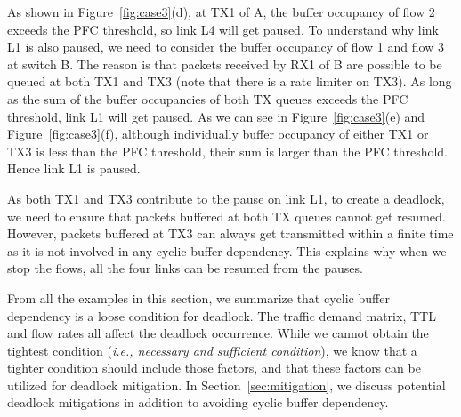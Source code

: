 As shown in Figure~\ref{fig:case3}(d), at TX1 of A, the buffer occupancy of flow 2 exceeds the PFC 
threshold, so link L4 will get paused. To understand why link L1 is also paused, we need to consider 
the buffer occupancy of flow 1 and flow 3 at switch B. The reason is that packets received by RX1 of 
B are possible to be queued at both TX1 and TX3 (note that there is a rate limiter on TX3). As long 
as the sum of the buffer occupancies of both TX queues exceeds the PFC threshold, link L1 will get paused. 
As we can see in Figure~\ref{fig:case3}(e) and Figure~\ref{fig:case3}(f), although individually buffer 
occupancy of either TX1 or TX3 is less than the PFC threshold, their sum is larger than the PFC 
threshold. Hence link L1 is paused.

As both TX1 and TX3 contribute to the pause on link L1, to create a deadlock, we need to ensure that 
packets buffered at both TX queues cannot get resumed. However, packets buffered at TX3 can always get 
transmitted within a finite time as it is not involved in any cyclic buffer dependency. This explains 
why when we stop the flows, all the four links can be resumed from the pauses. 
\fi


 From all the examples in this section, we summarize that cyclic buffer dependency is
 a loose condition for deadlock. The traffic demand matrix, TTL and flow rates all affect the deadlock
 occurrence. While we cannot obtain the tightest condition ({\em i.e., necessary and sufficient condition}), 
we know that a tighter condition should include those factors, and that these factors can be utilized
for deadlock mitigation. In Section~\ref{sec:mitigation}, we discuss potential deadlock mitigations in 
addition to avoiding cyclic buffer dependency.

